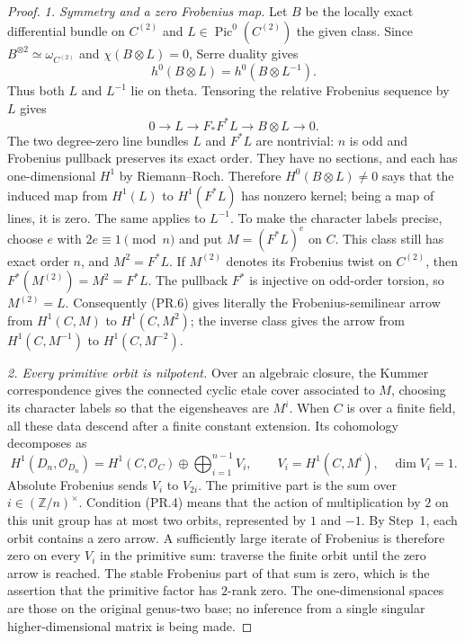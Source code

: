 \begin{proof}
\emph{1. Symmetry and a zero Frobenius map.}
Let $B$ be the locally exact differential bundle on $C^{(2)}$ and
$L\in\operatorname{Pic}^0(C^{(2)})$ the given class. Since
$B^{\otimes2}\simeq\omega_{C^{(2)}}$ and $\chi(B\otimes L)=0$,
Serre duality gives
\[
 h^0(B\otimes L)=h^0(B\otimes L^{-1}).
 \tag{PR.5}
\]
Thus both $L$ and $L^{-1}$ lie on theta. Tensoring the relative
Frobenius sequence by $L$ gives
\[
 0\longrightarrow L\longrightarrow F_*F^*L
       \longrightarrow B\otimes L\longrightarrow0.
 \tag{PR.6}
\]
The two degree-zero line bundles $L$ and $F^*L$ are nontrivial:
$n$ is odd and Frobenius pullback preserves its exact order.
They have no sections, and each has one-dimensional $H^1$ by
Riemann--Roch. Therefore $H^0(B\otimes L)\ne0$ says that the
induced map from $H^1(L)$ to $H^1(F^*L)$ has nonzero kernel;
being a map of lines, it is zero. The same applies to $L^{-1}$.
To make the character labels precise, choose $e$ with $2e\equiv1
\pmod n$ and put $M=(F^*L)^e$ on $C$. This class still has exact
order $n$, and $M^2=F^*L$. If $M^{(2)}$ denotes its Frobenius
twist on $C^{(2)}$, then $F^*(M^{(2)})=M^2=F^*L$.
The pullback $F^*$ is injective on odd-order torsion, so
$M^{(2)}=L$. Consequently (PR.6) gives literally the
Frobenius-semilinear arrow from $H^1(C,M)$ to $H^1(C,M^2)$;
the inverse class gives the arrow from $H^1(C,M^{-1})$ to
$H^1(C,M^{-2})$.

\emph{2. Every primitive orbit is nilpotent.}
Over an algebraic closure, the Kummer correspondence gives the
connected cyclic etale cover associated to $M$, choosing its
character labels so that the eigensheaves are $M^i$.
When $C$ is over a finite field, all these data descend after a
finite constant extension. Its cohomology decomposes as
\[
 H^1(D_n,\mathcal O_{D_n})=
   H^1(C,\mathcal O_C)\oplus
   \bigoplus_{i=1}^{n-1} V_i,\qquad
   V_i=H^1(C,M^i),\quad \dim V_i=1.
 \tag{PR.7}
\]
Absolute Frobenius sends $V_i$ to $V_{2i}$. The primitive part is
the sum over $i\in(\mathbb Z/n)^\times$.
Condition (PR.4) means that the action of multiplication by $2$
on this unit group has at most two orbits, represented by $1$ and
$-1$. By Step~1, each orbit contains a zero arrow. A sufficiently
large iterate of Frobenius is therefore zero on every $V_i$ in
the primitive sum: traverse the finite orbit until the zero arrow
is reached. The stable Frobenius part of that sum is zero, which
is the assertion that the primitive factor has $2$-rank zero.
The one-dimensional spaces are those on the original genus-two
base; no inference from a single singular higher-dimensional
matrix is being made.


\end{proof}
